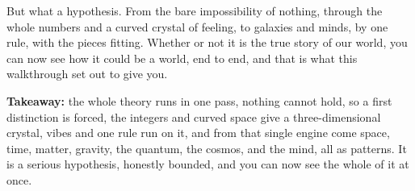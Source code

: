 But what a hypothesis. From the bare impossibility of nothing, through the whole numbers and a curved crystal of feeling, to galaxies and minds, by one rule, with the pieces fitting. Whether or not it is the true story of our world, you can now see how it could be a world, end to end, and that is what this walkthrough set out to give you.

\textbf{Takeaway:} the whole theory runs in one pass, nothing cannot hold, so a first distinction is forced, the integers and curved space give a three-dimensional crystal, vibes and one rule run on it, and from that single engine come space, time, matter, gravity, the quantum, the cosmos, and the mind, all as patterns. It is a serious hypothesis, honestly bounded, and you can now see the whole of it at once.
